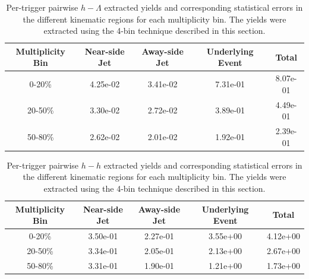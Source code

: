 \documentclass[ALICE,manyauthors]{ALICE_analysis_notes}
\begin{document}
\begin{table}[h!]
\centering
\begin{tabular}{| c || c | c | c | c | }
\hline
Multiplicity Bin & Near-side Jet & Away-side Jet & Underlying Event & Total  \\
\hline

0-20\% & 4.25e-02  & 3.41e-02  & 7.31e-01 & 8.07e-01 \\
20-50\% & 3.30e-02 & 2.72e-02  & 3.89e-01 & 4.49e-01 \\
50-80\% & 2.62e-02 & 2.01e-02  & 1.92e-01 & 2.39e-01 \\

\hline
\end{tabular}
\caption{Per-trigger pairwise $h-\Lambda$ extracted yields and corresponding statistical errors in the different kinematic regions for each multiplicity bin. The yields were extracted using the 4-bin technique described in this section.}
\label{h_lambda_yield_table_4bin}
\end{table}
	
\begin{table}[h!]
\centering
\begin{tabular}{| c || c | c | c | c | }
\hline
Multiplicity Bin & Near-side Jet & Away-side Jet & Underlying Event & Total  \\
\hline

0-20\% & 3.50e-01  & 2.27e-01  & 3.55e+00 & 4.12e+00 \\
20-50\% & 3.34e-01 & 2.05e-01  & 2.13e+00 & 2.67e+00 \\
50-80\% & 3.31e-01 & 1.90e-01  & 1.21e+00 & 1.73e+00 \\

\hline
\end{tabular}
\caption{Per-trigger pairwise $h-h$ extracted yields and corresponding statistical errors in the different kinematic regions for each multiplicity bin. The yields were extracted using the 4-bin technique described in this section.}
\label{h_h_yield_table_4bin}
\end{table}
\end{document}
